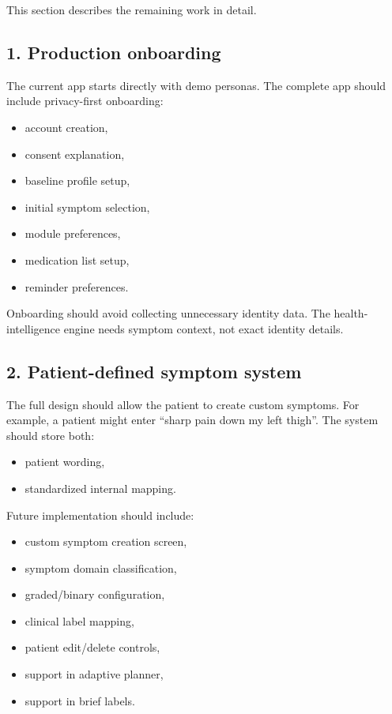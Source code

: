 \documentclass[11pt,a4paper]{article}
\begin{document}
This section describes the remaining work in detail.

\subsection{1. Production onboarding}

The current app starts directly with demo personas. The complete app should include privacy-first onboarding:

\begin{itemize}
  \item account creation,
  \item consent explanation,
  \item baseline profile setup,
  \item initial symptom selection,
  \item module preferences,
  \item medication list setup,
  \item reminder preferences.
\end{itemize}

Onboarding should avoid collecting unnecessary identity data. The health-intelligence engine needs symptom context, not exact identity details.

\subsection{2. Patient-defined symptom system}

The full design should allow the patient to create custom symptoms. For example, a patient might enter ``sharp pain down my left thigh''. The system should store both:

\begin{itemize}
  \item patient wording,
  \item standardized internal mapping.
\end{itemize}

Future implementation should include:

\begin{itemize}
  \item custom symptom creation screen,
  \item symptom domain classification,
  \item graded/binary configuration,
  \item clinical label mapping,
  \item patient edit/delete controls,
  \item support in adaptive planner,
  \item support in brief labels.
\end{itemize}
\end{document}
